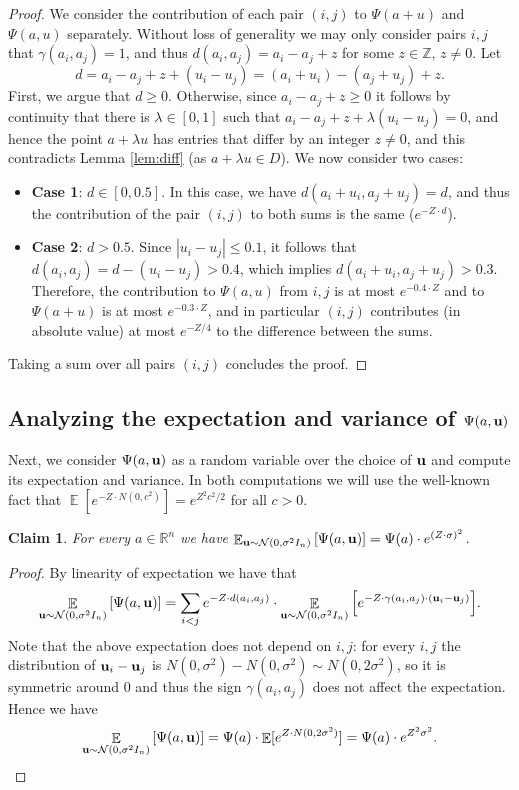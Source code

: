 \documentclass[10pt,a4paper]{article}
\newtheorem{claim}[thm]{Claim}
\newcommand\E{\mathop{\mathbb{E}}}
\newcommand\card[1]{\left| {#1} \right|}
\newcommand\Expect[2]{{\mathop{\mathbb{E}}_{#1}\left[ {#2} \right]}}
\renewcommand\geq{\geqslant}
\renewcommand\leq{\leqslant}
\newcommand{\ZZ}{\mathbb{Z}}
\newcommand{\ga}{\gamma}
\newcommand{\si}{\sigma}
\begin{document}
\begin{proof}
   We consider the contribution of each pair $(i,j)$ to $\Psi(a+u)$ and $\Psi(a,u)$ separately.
   Without loss of generality we may only consider pairs $i,j$ that $\ga(a_i,a_j)=1$,
   and thus $d(a_i,a_j)= a_i - a_j + z$ for some $z\in \ZZ$, $z\neq 0$.
   Let
   \[
   d= a_i - a_j + z + (u_i-u_j) = (a_i+u_i)- (a_j+u_j)+z.
   \]
   First, we argue that $d\geq 0$. Otherwise, since $a_i-a_j + z \geq 0$ it follows by continuity that there is
   $\lambda\in[0,1]$ such that $a_i - a_j + z + \lambda(u_i-u_j) = 0$, and hence the point $a+\lambda u$ has entries
   that differ by an integer $z\neq 0$, and this contradicts Lemma \ref{lem:diff} (as $a+\lambda u \in D$).
   We now consider two cases:
   \begin{itemize}
     \item {\bf Case 1}: $d \in [0,0.5]$. In this case, we have $d(a_i+u_i, a_j+u_j) = d$, and thus the contribution of the pair $(i,j)$ to both sums is the same ($e^{-Z\cdot d}$).
     \item {\bf Case 2}: $d > 0.5$. Since $\card{u_i-u_j}\leq 0.1$, it follows that $d(a_i,a_j) = d -(u_i-u_j) > 0.4$, which implies $d(a_i+u_i,a_j+u_j) > 0.3$. Therefore, the
     contribution to $\Psi(a,u)$ from $i,j$ is at most $e^{-0.4\cdot Z}$ and to $\Psi(a+u)$ is at most $e^{-0.3 \cdot Z}$, and in particular $(i,j)$ contributes (in absolute value)
     at most $e^{-Z/4}$ to the difference between the sums.
   \end{itemize}
   Taking a sum over all pairs $(i,j)$ concludes the proof.
\end{proof}


\subsection{Analyzing the expectation and variance of $\Psi(a,{\bf u})$}
Next,
we consider $\Psi(a,{\bf u})$ as a random variable over the choice of ${\bf u}$
and compute its expectation and variance. In both computations we will use
the well-known fact that $\E[e^{-Z\cdot N(0, c^2)}]=e^{Z^2 c^2/2}$ for all $c> 0$.

\begin{claim}
\label{cl:2}
For every $a\in\mathbb{R}^n$ we have $\Expect{{\bf u}\sim \mathcal{N}(0,\sigma^2 I_n)}{\Psi(a,{\bf u})} =\Psi(a)\cdot e^{(Z \cdot \si)^2}$.
\end{claim}

\begin{proof}
    By linearity of expectation we have that
	\[
	\Expect{{\bf u}\sim \mathcal{N}(0,\sigma^2I_n)}{\Psi(a,{\bf u})}
= \sum_{i<j} e^{-Z \cdot d(a_i,a_j)}\cdot \Expect{{\bf u}\sim \mathcal{N}(0,\sigma^2I_n)}{e^{-Z\cdot \ga(a_i,a_j)\cdot ({\bf u}_i-{\bf u}_j)}}.
	\]
    Note that the above expectation does not depend on $i,j$: for every $i,j$ the distribution of
    ${\bf u}_i - {\bf u}_j$ is $N(0,\si^2)-N(0,\si^2)\sim N(0,2\si^2)$, so it is symmetric around $0$ and thus
    the sign $\ga(a_i,a_j)$ does not affect the expectation. Hence we have
    \[
    \Expect{{\bf u}\sim \mathcal{N}(0,\sigma^2I_n)}{\Psi(a,{\bf u})}   = \Psi(a) \cdot \E [e^{Z\cdot N(0,2\sigma^2)}]
	=\Psi(a)\cdot e^{Z^2\si^2}.\qedhere
    \]
\end{proof}
\end{document}
